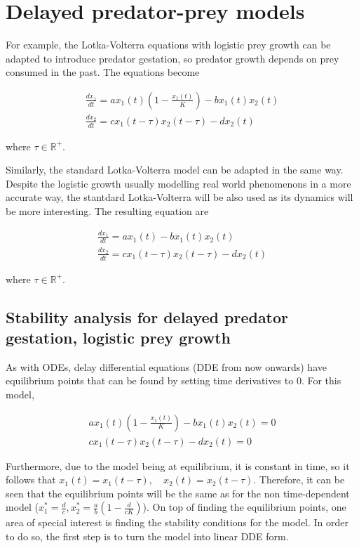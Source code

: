 \documentclass[11pt,oneside,parskip=half]{scrbook}  %
\begin{document}
\section{Delayed predator-prey models}

For example, the Lotka-Volterra equations with logistic prey growth can be adapted to introduce predator gestation, so predator growth depends on prey consumed in the past. The equations become

$$
\begin{matrix}
\frac{dx_1}{dt}=a x_1(t)\left(1-\frac{x_1(t)}{K}\right)-bx_1(t)x_2(t) \\
\frac{dx_2}{dt}= c x_1(t-\tau)x_2(t-\tau)-dx_2(t)
\end{matrix}
$$

where $\tau\in\mathbb R^+$.

Similarly, the standard Lotka-Volterra model can be adapted in the same way. Despite the logistic growth usually modelling real world phenomenons in a more accurate way, the stantdard Lotka-Volterra will be also used as its dynamics will be more interesting. The resulting equation are

$$
\begin{matrix}
\frac{dx_1}{dt}=a x_1(t)-bx_1(t)x_2(t) \\
\frac{dx_2}{dt}= c x_1(t-\tau)x_2(t-\tau)-dx_2(t)
\end{matrix}
$$

where $\tau\in\mathbb R^+$.

\subsection{Stability analysis for delayed predator gestation, logistic prey growth}

As with ODEs, delay differential equations (DDE from now onwards) have equilibrium points that can be found by setting time derivatives to 0. For this model,

$$
\begin{matrix}
a x_1(t)\left(1-\frac{x_1(t)}{K}\right)-bx_1(t)x_2(t)=0 \\
c x_1(t-\tau)x_2(t-\tau)-dx_2(t)=0
\end{matrix}
$$

Furthermore, due to the model being at equilibrium, it is constant in time, so it follows that $x_1(t)=x_1(t-\tau),\quad x_2(t)=x_2(t-\tau)$. Therefore, it can be seen that the equilibrium points will be the same as for the non time-dependent model ($x_1^*=\frac dc,x_2^*=\frac ab(1-\frac d{cK})$). On top of finding the equilibrium points, one area of special interest is finding the stability conditions for the model. In order to do so, the first step is to turn the model into linear DDE form.
\end{document}
